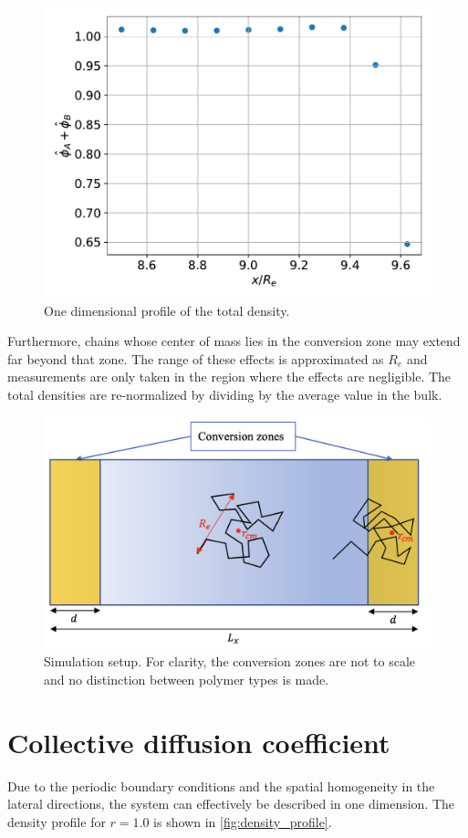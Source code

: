 \documentclass[bachelor,       %
               oneside,        %
               BCOR10mm,       %
               ngerman, english %
               ]{GAUBM}
\begin{document}
\begin{figure}[H]
  \centering
  \includegraphics[width=0.6\linewidth]{figures/density_drop.pdf}
  \caption{One dimensional profile of the total density.}
  \label{fig:density_drop}
\end{figure}

Furthermore, chains whose center of mass lies in the conversion zone may extend far beyond that zone. The range of these effects is approximated as $R_e$ and measurements are only taken in the region where the effects are negligible. The total densities are re-normalized by dividing by the average value in the bulk.


\begin{figure}[h]
  \centering
  \includegraphics[width=0.7\linewidth]{figures/simulation_box.png}
  \caption{Simulation setup. For clarity, the conversion zones are not to scale and no distinction between polymer types is made.}
  \label{fig:simulation_box}
\end{figure}


\section{Collective diffusion coefficient}
\label{sec:colldiff}

Due to the periodic boundary conditions and the spatial homogeneity in the lateral directions, the system can effectively be described in one dimension. The density profile for $r=1.0$ is shown in \autoref{fig:density_profile}.
\end{document}
